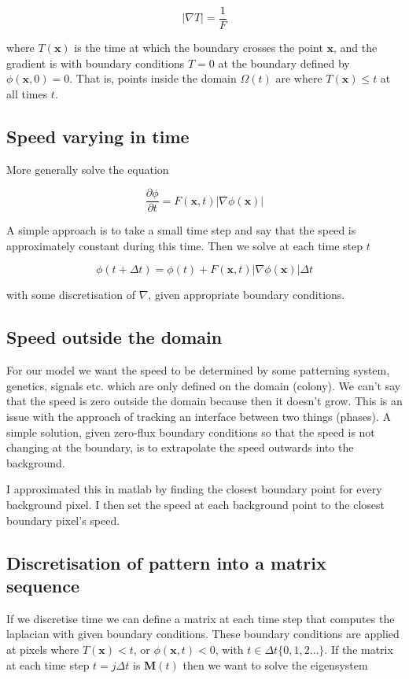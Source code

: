 \documentclass{article}
\renewcommand{\vec}[1]{\mathbf{#1}}
\newcommand{\mat}{\mathbf}
\begin{document}
\begin{equation}
\left| \nabla T \right| = \frac{1}{F}
\end{equation}

where $T(\vec{x})$ is the time at which the boundary crosses the point
$\vec{x}$, and the gradient is with boundary conditions $T=0$ at the 
 boundary defined by $\phi(\vec{x},0)=0$.
That is, points inside the domain $\Omega(t)$ are where
$T(\vec{x})\le t$ at all times $t$.


\subsection{Speed varying in time}
More generally solve the equation

\begin{equation}
\frac{\partial \phi}{\partial t} = F(\vec{x},t)\left|\nabla\phi(\vec{x})\right|
\end{equation}

A simple approach is to take a small time step and say that the speed is
approximately constant during this time. Then we solve at each time step $t$

\begin{equation}
\phi(t+\Delta t) = \phi(t) + F(\vec{x},t) \left|\nabla\phi(\vec{x})\right| \Delta t 
\end{equation}

with some discretisation of $\nabla$, given appropriate boundary conditions.

\subsection{Speed outside the domain}
For our model we want the speed to be determined by some patterning system,
genetics, signals etc. which are only defined on the domain (colony). We can't
say that the speed is zero outside the domain because then it doesn't grow. This
is an issue with the approach of tracking an interface between two things
(phases). A simple solution, given zero-flux boundary conditions so that the
speed is not changing at the boundary, is to extrapolate the speed outwards into
the background.

I approximated this in matlab by finding the closest boundary point for every
background pixel. I then set the speed at each background point 
to the closest boundary pixel's speed.

\subsection{Discretisation of pattern into a matrix sequence}
If we discretise time we can define a matrix at each time step that computes the
laplacian with given boundary conditions. These boundary conditions are applied
at pixels where $T(\vec{x})<t$, or $\phi(\vec{x},t)<0$, with $t \in \Delta
t\{0,1,2\dots\}$. If the matrix at each time step $t=j\Delta t$ is $\mat{M}(t)$
then we want to solve the eigensystem
\end{document}
